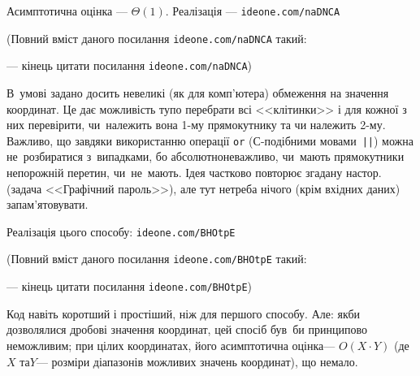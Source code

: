 \documentclass[14pt,a4paper]{extarticle}
\renewcommand{\baselinestretch}{1.3125}
\begin{document}
Асимптотична оцінка --- $\Theta(1)$. Реалізація --- 
\verb"ideone.com/naDNCA"


{\color{green}\begin{small}

\renewcommand{\baselinestretch}{0.875}

(Повний вміст даного посилання \verb"ideone.com/naDNCA" такий:

--- кінець цитати посилання \verb"ideone.com/naDNCA")

\end{small}}





В~умові задано досить невеликі (як для комп’ютера) обмеження на значення координат. Це дає можливість тупо перебрати всі <<клітинки>> і для кожної з них перевірити, чи~належить вона \mbox{1-му} прямокутнику та чи належить \mbox{2-му}. Важливо, що завдяки використанню операції \texttt{or} (\mbox{С-подіб}\-ними мовами~\verb"||") можна не~розбиратися з~випадками, бо абсолютно\nolinebreak[2] не\nolinebreak[3] важливо, чи~мають прямокутники непорожній перетин, чи~не~мають.
Ідея частково повторює згадану на\nolinebreak[3] стор.~\pageref{text:drawing-by-coords-in-graphics-password-problem} (задача <<Графічний пароль>>), але тут не\nolinebreak[3] треба нічого (крім вхідних даних) запам'ятовувати.

Реалізація цього способу: 
\verb"ideone.com/BHOtpE"


{\color{green}\begin{small}

\renewcommand{\baselinestretch}{0.875}

(Повний вміст даного посилання \verb"ideone.com/BHOtpE" такий:

--- кінець цитати посилання \verb"ideone.com/BHOtpE")

\end{small}}


\hspace{0.5em plus 1em}
Код навіть коротший і простіший, ніж для першого способу. Але: якби дозволялися дробові значення координат, цей спосіб був~би принципово неможливим; при цілих координатах, його асимптотична оцінка\nolinebreak[3] --- $O(X\cdot{}Y)$ (де\nolinebreak[2] $X$ та\nolinebreak[3] $Y$\nolinebreak[3] --- розміри діапазонів можливих значень координат), що немало.
\end{document}
